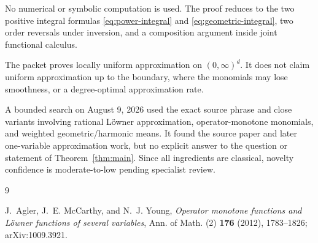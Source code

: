 \documentclass[11pt]{article}
\newcommand{\Pos}{(0,\infty)}
\begin{document}
No numerical or symbolic computation is used.  The proof reduces to the two
positive integral formulas \eqref{eq:power-integral} and
\eqref{eq:geometric-integral}, two order reversals under inversion, and a
composition argument inside joint functional calculus.

The packet proves locally uniform approximation on $\Pos^d$.  It does not
claim uniform approximation up to the boundary, where the monomials may lose
smoothness, or a degree-optimal approximation rate.

A bounded search on August 9, 2026 used the exact source phrase and close
variants involving rational L\"owner approximation, operator-monotone
monomials, and weighted geometric/harmonic means.  It found the source paper
and later one-variable approximation work, but no explicit answer to the
question or statement of Theorem~\ref{thm:main}.  Since all ingredients are
classical, novelty confidence is moderate-to-low pending specialist review.

\begin{thebibliography}{9}

J.~Agler, J.~E. McCarthy, and N.~J. Young,
\emph{Operator monotone functions and L\"owner functions of several
variables}, Ann. of Math. (2) \textbf{176} (2012), 1783--1826;
arXiv:1009.3921.

\end{thebibliography}
\end{document}
